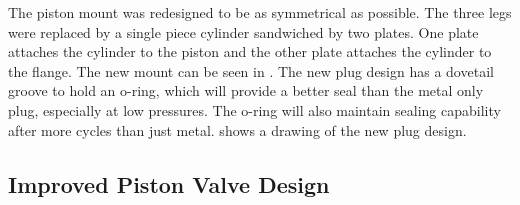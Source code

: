 The piston mount was redesigned to be as symmetrical as possible. The three legs were replaced by a single piece cylinder sandwiched by two plates. One plate attaches the cylinder to the piston and the other plate attaches the cylinder to the flange. The new mount can be seen in . The new plug design has a dovetail groove to hold an o-ring, which will provide a better seal than the metal only plug, especially at low pressures. The o-ring will also maintain sealing capability after more cycles than just metal.  shows a drawing of the new plug design.




\subsection{Improved Piston Valve Design}

